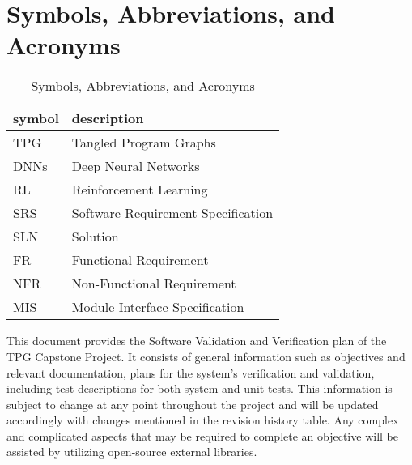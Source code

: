 \documentclass[12pt, titlepage]{article}
\begin{document}
\newpage

\tableofcontents

\listoftables



\newpage

\section{Symbols, Abbreviations, and Acronyms}

\renewcommand{\arraystretch}{1.2}
\begin{table}[h]
  \begin{tabular}{l l} 
    \toprule		
    \textbf{symbol} & \textbf{description}\\
    \midrule 
    TPG & Tangled Program Graphs\\
    DNNs & Deep Neural Networks\\
    RL & Reinforcement Learning\\
    SRS & Software Requirement Specification\\
    SLN & Solution\\
    FR & Functional Requirement\\
    NFR & Non-Functional Requirement\\
    MIS & Module Interface Specification\\
    \bottomrule
  \end{tabular}
  \caption{Symbols, Abbreviations, and Acronyms}
  \label{symbols}
\end{table}




\newpage


This document provides the Software Validation and Verification plan of the TPG Capstone Project. It consists of general information such as objectives and relevant documentation, plans for the system's verification and validation, including test descriptions for both system and unit tests. This information is subject to change at any point throughout the project and will be updated accordingly with changes mentioned in the revision history table.
Any complex and complicated aspects that may be required to complete an objective will be assisted by utilizing open-source external libraries.\\\\
\end{document}
